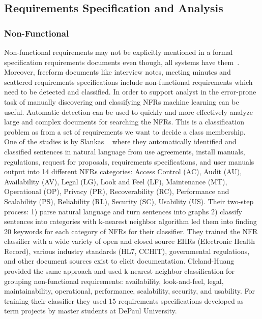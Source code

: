 \subsection{Requirements Specification and Analysis}

\subsubsection{Non-Functional}

Non-functional requirements may not be explicitly mentioned in a formal specification requirements documents even though, all systems have them~\cite{Slankas:2013}. Moreover, freeform documents like interview notes, meeting minutes and scattered requirements specifications include non-functional requirements which need to be detected and classified. In order to support analyst in the error-prone task of manually discovering and classifying NFRs machine learning can be useful. Automatic detection can be used to quickly and more effectively analyze large and complex documents for searching the NFRs\cite{Cleland-Huang2007}. This is a classification problem as from a set of requirements we want to decide a class membership. \\

One of the studies is by Slankas \etal~\cite{Slankas:2013} where they automatically identified and classified sentences in natural language from use agreements, install manuals, regulations, request for proposals, requirements specifications, and user manuals output into 14 different NFRs categories: Access Control (AC), Audit (AU), Availability (AV), Legal (LG), Look and Feel (LF), Maintenance (MT), Operational (OP), Privacy (PR), Recoverability (RC), Performance and Scalability (PS), Reliability (RL), Security (SC), Usability (US). Their two-step process: 1) parse natural language and turn sentences into graphs 2) classify sentences into categories with k-nearest neighbor algorithm led them into finding 20 keywords for each category of NFRs for their classifier. They trained the NFR classifier with a wide variety of open and closed source EHRs (Electronic Health Record), various industry standards (HL7, CCHIT), governmental regulations, and other document sources exist to elicit documentation.\newline
Cleland-Huang \etal~\cite{Cleland-Huang2007} provided the same approach and used k-nearest neighbor classification for grouping non-functional requirements: availability, look-and-feel, legal, maintainability, operational, performance, scalability, security, and usability. For training their classifier they used 15 requirements specifications developed as term projects by master students at DePaul University.

